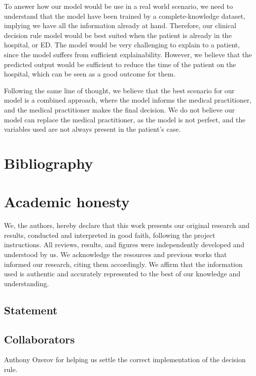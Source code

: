 \documentclass[10pt,letterpaper]{article}
\begin{document}
To answer how our model would be use in a real world scenario, we need to understand that the model have been 
trained by a complete-knowledge dataset, implying we have all the information already at hand. Therefore, 
our clinical decision rule model would be best suited when the patient is already in the hospital, or ED.
The model would be very challenging to explain to a patient, since the model suffers from sufficient 
explainability. However, we believe that the predicted output would be sufficient to reduce the time of the 
patient on the hospital, which can be seen as a good outcome for them.

Following the same line of thought, we believe that the best scenario for our model is a combined approach, 
where the model informs the medical practitioner, and the medical practitioner makes the final decision. 
We do not believe our model can replace the medical practitioner, as the model is not perfect, and the variables
used are not always present in the patient's case.


\newpage
\section{Bibliography}

 

\appendix
\section{Academic honesty}
We, the authors, hereby declare that this work presents our original research and results, conducted and interpreted in good faith, following the project instructions. All reviews, results, and figures were independently developed and understood by us. We acknowledge the resources and previous works that informed our research, citing them accordingly. We affirm that the information used is authentic and accurately represented to the best of our knowledge and understanding.

\subsection{Statement}

\subsection{Collaborators}
Anthony Ozerov for helping us settle the correct implementation of the decision rule.
\end{document}

